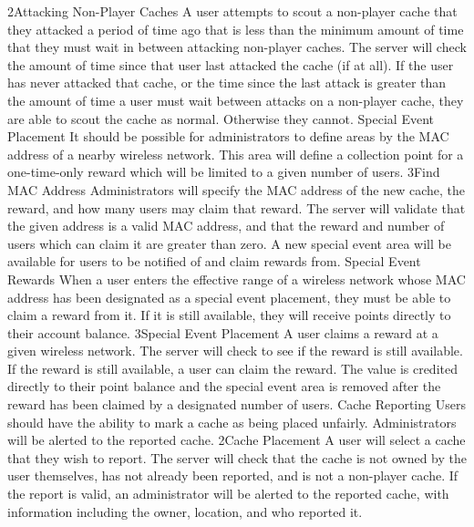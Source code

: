 			{2}{Attacking Non-Player Caches}
			{A user attempts to scout a non-player cache that they attacked a
			period of time ago that is less than the minimum amount of time
			that they must wait in between attacking non-player caches.}
			{The server will check the amount of time since that user last
			attacked the cache (if at all).}
			{If the user has never attacked that cache, or the time since the
			last attack is greater than the amount of time a user must wait
			between attacks on a non-player cache, they are able to scout the
			cache as normal. Otherwise they cannot.}
		\funcreq %
			{Special Event Placement}
			{It should be possible for administrators to define areas by the 
			MAC address of a nearby wireless network. This area will define a 
			collection point for a one-time-only reward which will be limited 
			to a given number of users.}
			{3}{Find MAC Address}
			{Administrators will specify the MAC address of the new cache, the 
			reward, and how many users may claim that reward.}
			{The server will validate that the given address is a valid MAC 
			address, and that the reward and number of users which can claim 
			it are greater than zero.}
			{A new special event area will be available for users to be 
			notified of and claim rewards from.}
		\funcreq %
			{Special Event Rewards}
			{When a user enters the effective range of a wireless network whose 
			MAC address has been designated as a special event placement, they 
		    must be able to claim a reward from it. If it is still available,
		    they will receive points directly to their account balance.}
			{3}{Special Event Placement}
			{A user claims a reward at a given wireless network.}
			{The server will check to see if the reward is still available.}
			{If the reward is still available, a user can claim the reward. 
			The value is credited directly to their point balance and the 
			special event area is removed after the reward has been claimed by 
			a designated number of users.}
		\funcreq %
			{Cache Reporting}
			{Users should have the ability to mark a cache as being placed
			unfairly. Administrators will be alerted to the reported cache.}
			{2}{Cache Placement}
			{A user will select a cache that they wish to report.}
			{The server will check that the cache is not owned by the user
			themselves, has not already been reported, and is not a non-player
			cache.}
			{If the report is valid, an administrator will be alerted to the 
			reported cache, with information including the owner, location, 
			and who reported it.}
		\funcreq %
